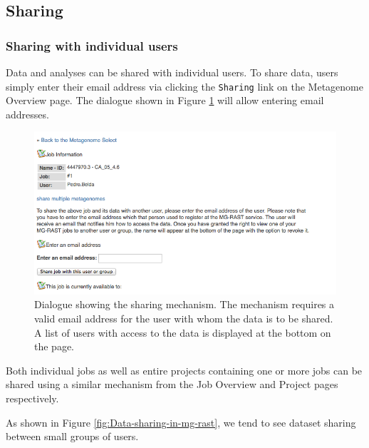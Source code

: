 \documentclass[12pt,fullpage]{report}
\begin{document}
\subsection{Sharing}
\subsubsection{Sharing with individual users}
\label{section:user_sharing}
Data and analyses can be shared with individual users. To share data, users simply enter their email address via clicking the \texttt{Sharing} link on the Metagenome Overview page. The dialogue shown in Figure \ref{fig:sharing} will allow entering email addresses.

\begin{figure}
\begin{center}
\includegraphics[width=6in]{Images/sharing}
\end{center}
\caption{
Dialogue showing the sharing mechanism.
The mechanism requires a valid email address for the user with whom the data is to be shared. A list of users with access to the data is displayed at the bottom on the page.
}
\label{fig:sharing}
\end{figure}

Both individual jobs as well as entire projects containing one or more jobs can be shared using a similar mechanism from the Job Overview and Project pages respectively.

As shown in Figure \ref{fig:Data-sharing-in-mg-rast}, we tend to see dataset sharing between small groups of users.
\end{document}
